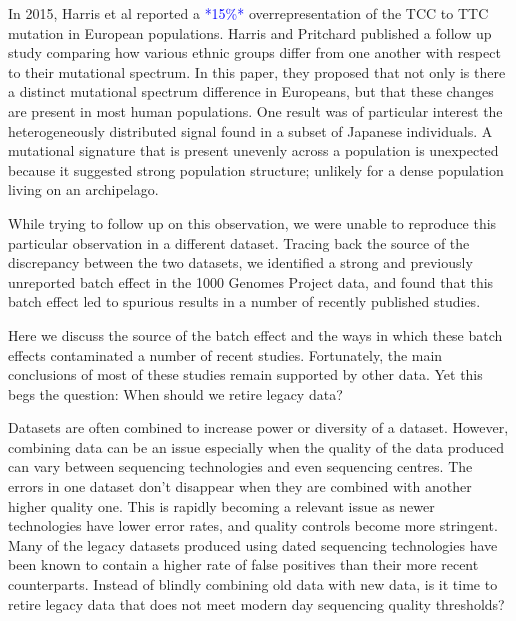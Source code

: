 \documentclass[9pt,lineno]{elife}
\newcommand{\sgcomment}[1]{\textcolor{blue}{SG: #1}}
\newcommand{\todo}[1]{\textcolor{blue}{*#1*}}
\begin{document}
In 2015, Harris et al reported a \todo{15\%} overrepresentation of the TCC to TTC mutation in European populations.
Harris and Pritchard published a follow up study comparing how various ethnic groups differ from one another with respect to their mutational spectrum. 
In this paper, they proposed that not only is there a distinct mutational spectrum difference in Europeans, but that these changes are present in most human populations. 
One result was of particular interest the heterogeneously distributed signal found in a subset of Japanese individuals. 
A mutational signature that is present unevenly across a population is unexpected because it suggested strong population structure; unlikely for a dense population living on an archipelago.

While trying to follow up on this observation, we were unable to reproduce this particular observation in a different dataset. Tracing back the source of the discrepancy between the two datasets, we identified a strong and previously unreported batch effect in the 1000 Genomes Project data, and found that this batch effect led to spurious results in a number of recently published studies. 

Here we discuss the source of the batch effect and the ways in which these batch effects contaminated a number of recent studies. Fortunately, the main conclusions of most of these studies remain supported by other data.  Yet this begs the question: When should we retire legacy data?





Datasets are often combined to increase power or diversity of a dataset.
However, combining data can be an issue especially when the quality of the data produced can vary between sequencing technologies and even sequencing centres.
The errors in one dataset don't disappear when they are combined with another higher quality one.
This is rapidly becoming a relevant issue as newer technologies have lower error rates, and quality controls become more stringent.
Many of the legacy datasets produced using dated sequencing technologies have been known to contain a higher rate of false positives than their more recent counterparts.
Instead of blindly combining old data with new data, is it time to retire legacy data that does not meet modern day sequencing quality thresholds? 
\end{document}
